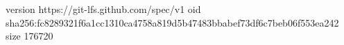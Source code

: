 version https://git-lfs.github.com/spec/v1
oid sha256:fc8289321f6a1cc1310ca4758a819d5b47483bbabef73df6c7beb06f553ea242
size 176720

